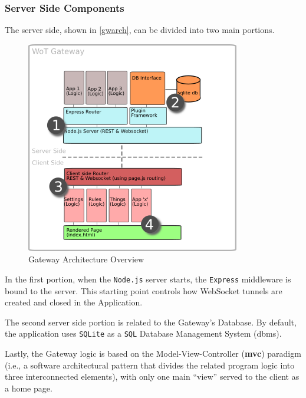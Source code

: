 \subsubsection{Server Side Components}
The server side, shown in \autoref{gwarch}, can be divided into two main portions.

\begin{figure}[H]
    \centering
    \includegraphics[scale=0.90]{images/webthings/architecture_overview.png}
    \caption{Gateway Architecture Overview \cite{gatewayarch}}
    \label{gwarch}
\end{figure}

In the first portion, when the \verb|Node.js| server starts, the \verb|Express| middleware is bound to the server.
This starting point controls how WebSocket tunnels are created and closed in the Application.

The second server side portion is related to the Gateway's Database. By default, the application uses \texttt{SQLite} \cite{sqlitehome} as a \texttt{SQL} Database Management System (\gls{dbms}).

Lastly, the Gateway logic is based on the Model-View-Controller (\textbf{\gls{mvc}}) paradigm \cite{gamma1993design} (i.e., a software architectural pattern that divides the related program logic into three interconnected elements),
with only one main ``view'' served to the client as a home page.


